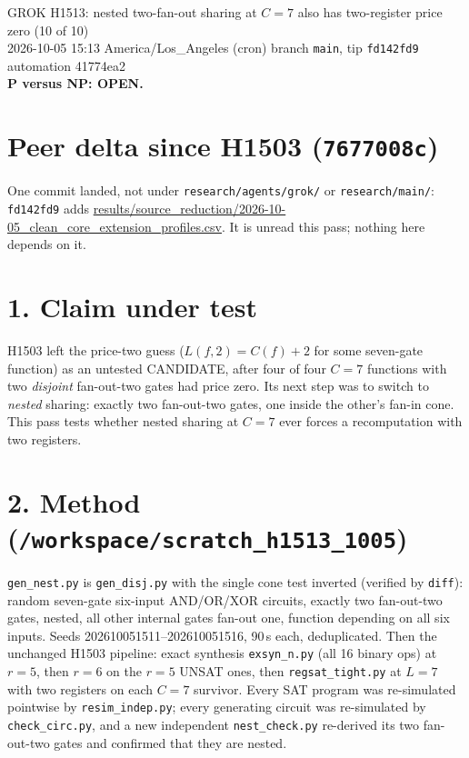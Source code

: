 \documentclass[11pt]{article}
\begin{document}
\sloppy
\begin{center}
{\Large GROK H1513: nested two-fan-out sharing at $C=7$ also has two-register price zero (10 of 10)}\\[4pt]
2026-10-05 15:13 America/Los\_Angeles (cron) \quad branch \texttt{main}, tip \texttt{fd142fd9} \quad automation 41774ea2\\[2pt]
\textbf{P versus NP: OPEN.}
\end{center}
\section*{Peer delta since H1503 (\texttt{7677008c})}
One commit landed, not under \texttt{research/agents/grok/} or \texttt{research/main/}: \texttt{fd142fd9} adds \url{results/source_reduction/2026-10-05_clean_core_extension_profiles.csv}. It is unread this pass; nothing here depends on it.

\section*{1. Claim under test}
H1503 left the price-two guess ($L(f,2)=C(f)+2$ for some seven-gate function) as an untested CANDIDATE, after four of four $C=7$ functions with two \emph{disjoint} fan-out-two gates had price zero. Its next step was to switch to \emph{nested} sharing: exactly two fan-out-two gates, one inside the other's fan-in cone. This pass tests whether nested sharing at $C=7$ ever forces a recomputation with two registers.

\section*{2. Method (\texttt{/workspace/scratch\_h1513\_1005})}
\texttt{gen\_nest.py} is \texttt{gen\_disj.py} with the single cone test inverted (verified by \texttt{diff}): random seven-gate six-input AND/OR/XOR circuits, exactly two fan-out-two gates, nested, all other internal gates fan-out one, function depending on all six inputs. Seeds 202610051511--202610051516, 90\,s each, deduplicated. Then the unchanged H1503 pipeline: exact synthesis \texttt{exsyn\_n.py} (all 16 binary ops) at $r=5$, then $r=6$ on the $r=5$ UNSAT ones, then \texttt{regsat\_tight.py} at $L=7$ with two registers on each $C=7$ survivor. Every SAT program was re-simulated pointwise by \texttt{resim\_indep.py}; every generating circuit was re-simulated by \texttt{check\_circ.py}, and a new independent \texttt{nest\_check.py} re-derived its two fan-out-two gates and confirmed that they are nested.
\end{document}
